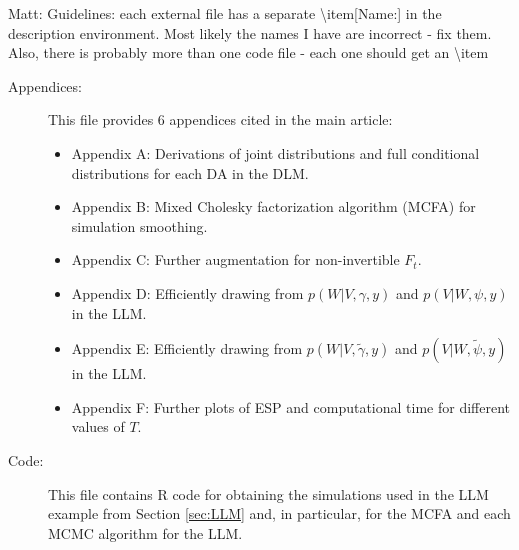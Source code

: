 \documentclass[12pt]{article}
\newcommand{\matt}[1]{{\color{red} Matt: #1}}
\begin{document}
\matt{Guidelines: each external file has a separate \textbackslash item[Name:] in the description environment. Most likely the names I have are incorrect - fix them. Also, there is probably more than one code file - each one should get an \textbackslash item}
\begin{description}
\item[Appendices:] This file provides 6 appendices cited in the main article:
\begin{itemize}
\item[] Appendix A: Derivations of joint distributions and full conditional distributions for each DA in the DLM.
\item[] Appendix B: Mixed Cholesky factorization algorithm (MCFA) for simulation smoothing.
\item[] Appendix C: Further augmentation for non-invertible $F_t$.
\item[] Appendix D: Efficiently drawing from $p(W|V,\gamma,y)$ and $p(V|W,\psi,y)$ in the LLM.
\item[] Appendix E: Efficiently drawing from $p(W|V,\tilde{\gamma},y)$ and $p(V|W,\tilde{\psi},y)$ in the LLM.
\item[] Appendix F: Further plots of ESP and computational time for different values of $T$.
\end{itemize}

\item[Code:] This file contains R code for obtaining the simulations used in the LLM example from Section \ref{sec:LLM} and, in particular, for the MCFA and each MCMC algorithm for the LLM.

\end{description}


\clearpage

\end{document}
